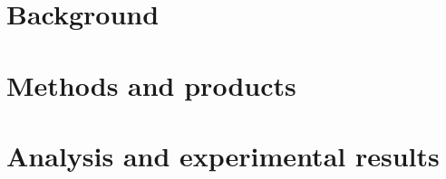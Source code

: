 \documentclass[10pt, a4paper, twoside, titlepage, openright]{book}
\begin{document}
    \frontmatter
    
    
    \tableofcontents
    
    \mainmatter
    
    \part{Background}\label{background}
    
    
    
    
    
    \part{Methods and products}\label{methods_products}
    
    
    
    \part{Analysis and experimental results}\label{analysis_experimental_results}
    
    
    
    
    \backmatter
    \printbibliography
\end{document}
